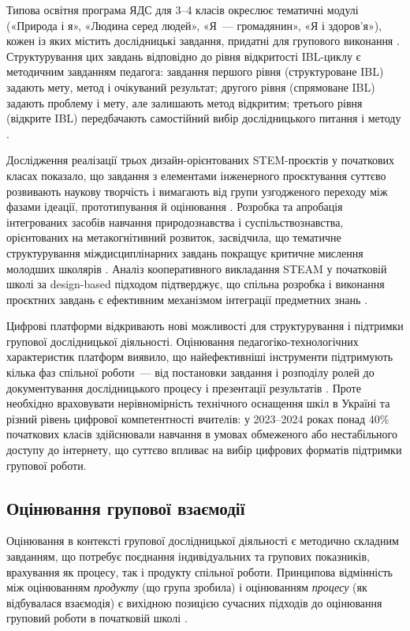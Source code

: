 \documentclass[a4paper,14pt]{extarticle}
\begin{document}
Типова освітня програма ЯДС для 3--4 класів окреслює тематичні модулі («Природа і я», «Людина серед людей», «Я~--- громадянин», «Я і здоров'я»), кожен із яких містить дослідницькі завдання, придатні для групового виконання \parencite{Savchenko2019}. Структурування цих завдань відповідно до рівня відкритості IBL-циклу є методичним завданням педагога: завдання першого рівня (структуроване IBL) задають мету, метод і очікуваний результат; другого рівня (спрямоване IBL) задають проблему і мету, але залишають метод відкритим; третього рівня (відкрите IBL) передбачають самостійний вибір дослідницького питання і методу \parencite{Aminga2026}.

Дослідження реалізації трьох дизайн-орієнтованих STEM-проєктів у початкових класах показало, що завдання з елементами інженерного проєктування суттєво розвивають наукову творчість і вимагають від групи узгодженого переходу між фазами ідеації, прототипування й оцінювання \parencite{Zhang2025568}. Розробка та апробація інтегрованих засобів навчання природознавства і суспільствознавства, орієнтованих на метакогнітивний розвиток, засвідчила, що тематичне структурування міждисциплінарних завдань покращує критичне мислення молодших школярів \parencite{Sururuddin2026}. Аналіз кооперативного викладання STEAM у початковій школі за design-based підходом підтверджує, що спільна розробка і виконання проєктних завдань є ефективним механізмом інтеграції предметних знань \parencite{Li2022}.

Цифрові платформи відкривають нові можливості для структурування і підтримки групової дослідницької діяльності. Оцінювання педагогіко-технологічних характеристик платформ виявило, що найефективніші інструменти підтримують кілька фаз спільної роботи~--- від постановки завдання і розподілу ролей до документування дослідницького процесу і презентації результатів \parencite{Baziukė2025}. Проте необхідно враховувати нерівномірність технічного оснащення шкіл в Україні та різний рівень цифрової компетентності вчителів: у 2023--2024 роках понад 40\% початкових класів здійснювали навчання в умовах обмеженого або нестабільного доступу до інтернету, що суттєво впливає на вибір цифрових форматів підтримки групової роботи.

\subsection{Оцінювання групової взаємодії}

Оцінювання в контексті групової дослідницької діяльності є методично складним завданням, що потребує поєднання індивідуальних та групових показників, врахування як процесу, так і продукту спільної роботи. Принципова відмінність між оцінюванням \textit{продукту} (що група зробила) і оцінюванням \textit{процесу} (як відбувалася взаємодія) є вихідною позицією сучасних підходів до оцінювання груповий роботи в початковій школі \parencite{Pometun2004}.
\end{document}
